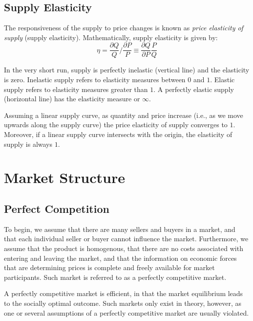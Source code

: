 \documentclass[
  oneside]{book}
\begin{document}
\hypertarget{supply-elasticity}{%
\subsection{Supply Elasticity}\label{supply-elasticity}}

The responsiveness of the supply to price changes is known as \emph{price elasticity of supply} (supply elasticity). Mathematically, supply elasticity is given by: \[\eta = \frac{\partial Q}{Q}/\frac{\partial P}{P} \equiv \frac{\partial Q}{\partial P}\frac{P}{Q}\]

In the very short run, supply is perfectly inelastic (vertical line) and the elasticity is zero. Inelastic supply refers to elasticity measures between \(0\) and \(1\). Elastic supply refers to elasticity measures greater than \(1\). A perfectly elastic supply (horizontal line) has the elasticity measure or \(\infty\).

Assuming a linear supply curve, as quantity and price increase (i.e., as we move upwards along the supply curve) the price elasticity of supply converges to \(1\). Moreover, if a linear supply curve intersects with the origin, the elasticity of supply is always \(1\).

\hypertarget{market-structure}{%
\section{Market Structure}\label{market-structure}}

\hypertarget{perfect-competition}{%
\subsection{Perfect Competition}\label{perfect-competition}}

To begin, we assume that there are many sellers and buyers in a market, and that each individual seller or buyer cannot influence the market. Furthermore, we assume that the product is homogenous, that there are no costs associated with entering and leaving the market, and that the information on economic forces that are determining prices is complete and freely available for market participants. Such market is referred to as a perfectly competitive market.

A perfectly competitive market is efficient, in that the market equilibrium leads to the socially optimal outcome. Such markets only exist in theory, however, as one or several assumptions of a perfectly competitive market are usually violated.
\end{document}
